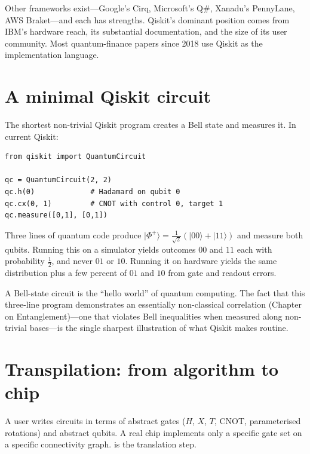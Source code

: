 Other frameworks exist---Google's Cirq, Microsoft's Q\#, Xanadu's PennyLane, AWS Braket---and each has strengths. Qiskit's dominant position comes from IBM's hardware reach, its substantial documentation, and the size of its user community. Most quantum-finance papers since 2018 use Qiskit as the implementation language.

\section{A minimal Qiskit circuit}

The shortest non-trivial Qiskit program creates a Bell state and measures it. In current Qiskit:

\begin{verbatim}
from qiskit import QuantumCircuit

qc = QuantumCircuit(2, 2)
qc.h(0)             # Hadamard on qubit 0
qc.cx(0, 1)         # CNOT with control 0, target 1
qc.measure([0,1], [0,1])
\end{verbatim}

Three lines of quantum code produce $|\Phi^+\rangle = \tfrac{1}{\sqrt 2}(|00\rangle + |11\rangle)$ and measure both qubits. Running this on a simulator yields outcomes $00$ and $11$ each with probability $\tfrac12$, and never $01$ or $10$. Running it on hardware yields the same distribution plus a few percent of $01$ and $10$ from gate and readout errors.

\begin{example}
A Bell-state circuit is the ``hello world'' of quantum computing. The fact that this three-line program demonstrates an essentially non-classical correlation (Chapter on Entanglement)---one that violates Bell inequalities when measured along non-trivial bases---is the single sharpest illustration of what Qiskit makes routine.
\end{example}

\section{Transpilation: from algorithm to chip}

A user writes circuits in terms of abstract gates ($H$, $X$, $T$, CNOT, parameterised rotations) and abstract qubits. A real chip implements only a specific gate set on a specific connectivity graph.  is the translation step.

